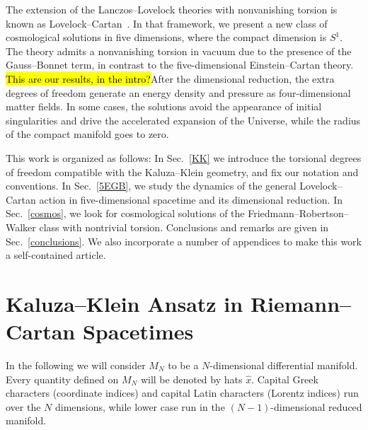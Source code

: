 \documentclass[aps,prd,12pt,superscriptaddress,showpacs,showkeys,longbibliography,reprint,nofootinbib]{revtex4-1}
\begin{document}
The extension of the Lanczos--Lovelock theories with nonvanishing torsion is known as Lovelock--Cartan~\cite{Mardones:1990qc}. In that framework, we present a new class of cosmological solutions in five dimensions, where the compact dimension is $S^1$. The theory admits a nonvanishing torsion in vacuum due to the presence of the Gauss--Bonnet term, in contrast to the five-dimensional Einstein--Cartan theory. \hl{This are our results, in the intro?}After the dimensional reduction, the extra degrees of freedom generate an energy density and pressure as four-dimensional matter fields. In some cases, the solutions avoid the appearance of initial singularities and drive the accelerated expansion of the Universe, while the radius of the compact manifold goes to zero.  

This work is organized as follows: In Sec.~\ref{KK} we introduce the torsional degrees of freedom compatible with the Kaluza--Klein geometry, and fix our notation and conventions. In Sec.~\ref{5EGB}, we study the dynamics of the general Lovelock--Cartan action in five-dimensional spacetime and its dimensional reduction. In Sec.~\ref{cosmos}, we look for cosmological solutions of the Friedmann--Robertson--Walker class with nontrivial torsion. Conclusions and remarks are given in Sec.~\ref{conclusions}. We also incorporate a number of appendices to make this work a self-contained article.


\section{Kaluza--Klein Ansatz in Riemann--Cartan Spacetimes\label{KK}}

In the following we will consider $M_N$ to be a $N$-dimensional differential manifold. Every quantity defined on $M_N$ will be denoted by hats $\hat{x}$. Capital Greek characters (coordinate indices) and capital Latin characters (Lorentz indices) run over the $N$ dimensions, while lower case run in the $(N-1)$-dimensional reduced manifold.
\end{document}
